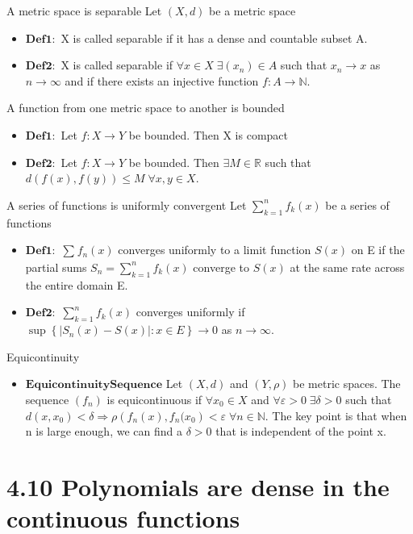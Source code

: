 \documentclass[a4paper,norsk]{article}
\renewcommand{\leq}{\leqslant}
\renewcommand{\epsilon}{\varepsilon}
\begin{document}
\begin{oppgavebox}{A metric space is separable}{}
Let $ \left( X, d \right)  $ be a metric space
\begin{itemize}
  \item $ \mathbf{Def1:} $ X is called separable if it has a dense and countable subset A.
  \item $ \mathbf{Def2:} $ X is called separable if $ \forall x \in X \; \exists \left( x_n \right) \in  A  $ such that $ x_n \to x $ as $ n \to \infty $  and if there exists an injective function $ f : A \to \mathbb{N} $.
\end{itemize}
\end{oppgavebox}


\begin{oppgavebox}{A function from one metric space to another is bounded}{}
\begin{itemize}
  \item $ \mathbf{Def1:} $ Let $ f : X \to Y $ be bounded. Then X is compact
  \item $ \mathbf{Def2:} $ Let $ f: X \to Y $ be bounded. Then $ \exists M \in \mathbb{R} $ such that $ d \left( f(x), f(y) \right) \leq M \; \forall x, y \in X $.
\end{itemize}
\end{oppgavebox}

\begin{oppgavebox}{A series of functions is uniformly convergent}{}
Let $ \sum_{ k=1 }^{ n } f_k(x)  $ be a series of functions
\begin{itemize}
  \item $ \mathbf{Def1:} $ $ \sum_{}^{} f_n(x)  $ converges uniformly to a limit function $ S(x) $ on E if the partial sums $ S_n = \sum_{ k=1 }^{ n } f_k(x) $ converge to $ S(x) $ at the same rate across the entire domain E.
  \item $ \mathbf{Def2:} $ $ \sum_{ k=1 }^{ n } f_k(x)  $ converges uniformly if $ \sup \left\{ \left| S_n(x) - S(x) \right| : x \in E \right\} \to 0 $  as $ n \to \infty $. 
\end{itemize}
\end{oppgavebox}


\begin{oppgavebox}{Equicontinuity}{}
\begin{itemize}
  \item $ \mathbf{EquicontinuitySequence} $ Let $ \left( X, d \right)  $  and $ \left( Y, \rho \right)  $ be metric spaces. The sequence $ \left( f_n \right)  $ is equicontinuous if $ \forall x_0 \in  X $ and $ \forall \epsilon > 0 \; \exists  \delta > 0 $  such that $ d \left( x, x_0 \right) < \delta  \Rightarrow \rho \left( f_n(x), f_n(x_0 \right) < \epsilon \; \forall n \in \mathbb{N} $. The key point is that when n is large enough, we can find a $ \delta > 0  $ that is independent of the point x.
\end{itemize}
\end{oppgavebox}


\section*{4.10 Polynomials are dense in the continuous functions}
\end{document}
